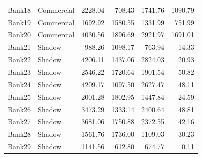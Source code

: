 \begin{longtable}{@{}llrrrr@{}}
Bank18 & Commercial & 2228.04 & 708.43 & 1741.76 & 1090.79 \\
Bank19 & Commercial & 1692.92 & 1580.55 & 1331.99 & 751.99 \\
Bank20 & Commercial & 4030.56 & 1896.69 & 2921.97 & 1691.01 \\
Bank21 & Shadow & 988.26 & 1098.17 & 763.94 & 14.33 \\
Bank22 & Shadow & 4206.11 & 1437.06 & 2824.03 & 20.93 \\
Bank23 & Shadow & 2546.22 & 1720.64 & 1901.54 & 50.82 \\
Bank24 & Shadow & 4209.17 & 1097.50 & 2627.47 & 48.11 \\
Bank25 & Shadow & 2001.28 & 1802.95 & 1447.84 & 24.59 \\
Bank26 & Shadow & 3473.29 & 1333.14 & 2400.64 & 48.81 \\
Bank27 & Shadow & 3681.06 & 1750.88 & 2372.55 & 42.16 \\
Bank28 & Shadow & 1561.76 & 1736.00 & 1109.03 & 30.23 \\
Bank29 & Shadow & 1141.56 & 612.80 & 674.77 & 0.11 \\
\end{longtable}

